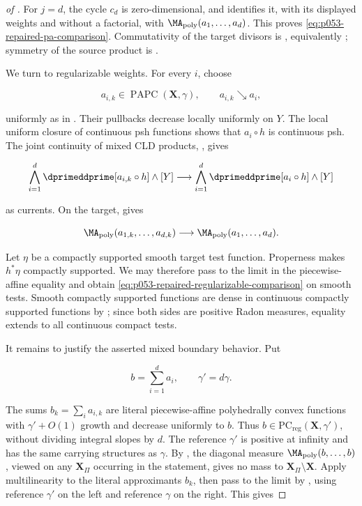 \begin{proof}[of
]
For \(j=d\), the cycle \(c_d\) is zero-dimensional, and
\cite[Definition~4.7]{BMPS26} identifies it, with its displayed weights and
without a factorial, with
\(\MA_{\mathrm{poly}}(a_1,\ldots,a_d)\).  This proves
\eqref{eq:p053-repaired-pa-comparison}.  Commutativity of the target
divisors is \cite[Proposition~1.14]{GK17}, equivalently
\cite[Lemma~2.35]{BMPS26}; symmetry of the source product is
\cite[Proposition~8.7.4]{CLD25}.

We turn to regularizable weights.  For every \(i\), choose

\[
 a_{i,k}\in\operatorname{PAPC}(\mathbf X,\gamma),
 \qquad a_{i,k}\searrow a_i,
\]

uniformly as in \cite[Definition~3.23]{BMPS26}.  Their pullbacks decrease
locally uniformly on \(Y\).  The local uniform closure of continuous psh
functions shows that \(a_i\circ h\) is continuous psh.  The joint continuity
of mixed CLD products, \cite[Proposition~8.7.2]{CLD25}, gives

\begin{equation}
 \bigwedge_{i=1}^d\dprimeddprime[a_{i,k}\circ h]\wedge[Y]
 \longrightarrow
 \bigwedge_{i=1}^d\dprimeddprime[a_i\circ h]\wedge[Y]
 \label{eq:p053-repaired-cld-limit}
\end{equation}

as currents.  On the target, \cite[Theorem~4.13]{BMPS26} gives

\begin{equation}
 \MA_{\mathrm{poly}}(a_{1,k},\ldots,a_{d,k})
 \longrightarrow
 \MA_{\mathrm{poly}}(a_1,\ldots,a_d).
 \label{eq:p053-repaired-poly-limit}
\end{equation}

Let \(\eta\) be a compactly supported smooth target test function.
Properness makes \(h^*\eta\) compactly supported.  We may therefore pass to
the limit in the piecewise-affine equality and obtain
\eqref{eq:p053-repaired-regularizable-comparison} on smooth tests.  Smooth
compactly supported functions are dense in continuous compactly supported
functions by \cite[Theorem~6.2.5 and Corollary~6.2.6]{CLD25}; since both sides
are positive Radon measures, equality extends to all continuous compact
tests.

It remains to justify the asserted mixed boundary behavior.  Put

\[
 b=\sum_{i=1}^d a_i,
 \qquad \gamma'=d\gamma.
\]

The sums \(b_k=\sum_i a_{i,k}\) are literal piecewise-affine
polyhedrally convex functions with \(\gamma'+O(1)\) growth and decrease
uniformly to \(b\).  Thus
\(b\in\mathrm{PC}_{\mathrm{reg}}(\mathbf X,\gamma')\), without dividing
integral slopes by \(d\).  The reference \(\gamma'\) is positive at
infinity and has the same carrying structures as \(\gamma\).
By \cite[Proposition~4.16]{BMPS26}, the diagonal
measure \(\MA_{\mathrm{poly}}(b,\ldots,b)\), viewed on any
\(\mathbf X_\Pi\) occurring in the statement, gives no mass to
\(\mathbf X_\Pi\setminus\mathbf X\).  Apply multilinearity to the
literal approximants \(b_k\), then pass to the limit by
\cite[Theorem~4.13]{BMPS26}, using reference \(\gamma'\) on the left
and reference \(\gamma\) on the right.  This gives


\end{proof}
